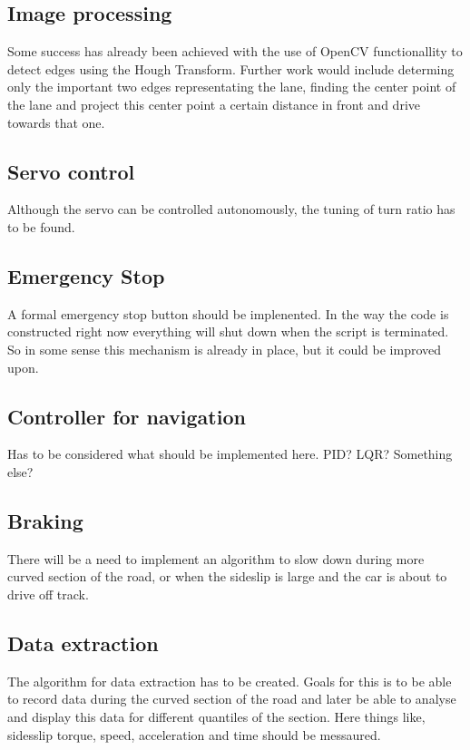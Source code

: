 \documentclass{article}
\begin{document}
	\subsection{Image processing}
		Some success has already been achieved with the use of OpenCV functionallity to detect edges using the Hough Transform. Further work would include determing only the important two edges representating the lane, finding the center point of the lane and project this center point a certain distance in front and drive towards that one. \\

	\subsection{Servo control}
		Although the servo can be controlled autonomously, the tuning of turn ratio has to be found.

	\subsection{Emergency Stop}
		A formal emergency stop button should be implenented. In the way the code is constructed right now everything will shut down when the script is terminated. So in some sense this mechanism is already in place, but it could be improved upon.

	\subsection{Controller for navigation}
		Has to be considered what should be implemented here. PID? LQR? Something else?

	\subsection{Braking}
		There will be a need to implement an algorithm to slow down during more curved section of the road, or when the sideslip is large and the car is about to drive off track.

	\subsection{Data extraction}
		The algorithm for data extraction has to be created. Goals for this is to be able to record data during the curved section of the road and later be able to analyse and display this data for different quantiles of the section. Here things like, sidesslip torque, speed, acceleration and time should be messaured.
\end{document}
